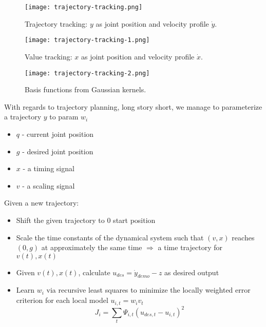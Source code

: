 \begin{figure}[hbt!]
	\centering
	\begin{minipage}{0.49\textwidth}
		\centering
		\texttt{[image: trajectory-tracking.png]}
		\caption{Trajectory tracking: $y$ as joint position and velocity profile $\dot{y}$.}
		\label{fig:trajectory-tracking}
	\end{minipage}\hfill
	\begin{minipage}{0.49\textwidth}
		\centering
		\texttt{[image: trajectory-tracking-1.png]}
		\caption{Value tracking: $x$ as joint position and velocity profile $\dot{x}$.}
		\label{fig:trajectory-tracking-1}
	\end{minipage}
	\begin{minipage}{0.4\textwidth}
		\centering
		\texttt{[image: trajectory-tracking-2.png]}
		\caption{Basis functions from Gaussian kernels.}
		\label{fig:trajectory-tracking-2}
	\end{minipage}
\end{figure}

With regards to trajectory planning, long story short, we manage to parameterize a trajectory $y$ to \ac{param} $w_i$
\begin{itemize}
	\item $q$ - current joint position
	\item $g$ - desired joint position
	\item $x$ - a timing signal
	\item $v$ - a scaling signal
\end{itemize}

Given a new trajectory:
\begin{itemize}
	\item Shift the given trajectory to $0$ start position
	\item Scale the time constants of the dynamical system such that $(v,x)$ reaches $(0,g)$ at approximately the same time $\Rightarrow$ a time trajectory for $v(t),x(t)$
	\item Given $v(t),x(t)$, calculate $u_{des} = \dot{y}_{demo} - z$ as desired output
	\item Learn $w_i$ via recursive least squares to minimize the locally weighted error criterion for each local model $u_{i,t} = w_i v_t$
	\[J_i = \sum_t \Psi_{i,t} (u_{des,t} - u_{i,t})^2\]
\end{itemize}

